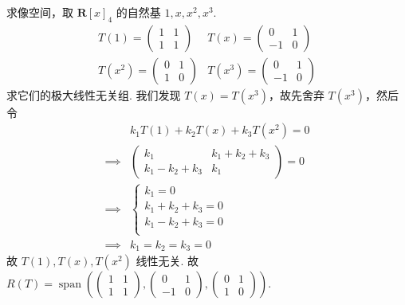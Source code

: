 \documentclass[12pt,fontset=fandol]{ctexart}
\begin{document}
\begin{solve}
\begin{enumerate}
                      求像空间，取 $ \mathbf{R}[x]_4 $ 的自然基 $ 1, x, x^2, x^3 $.
                      \[ \begin{matrix}
                              T(1) = \begin{pmatrix} 1 & 1 \\ 1 & 1 \end{pmatrix}   & T(x) = \begin{pmatrix} 0 & 1 \\ -1 & 0 \end{pmatrix}   \\
                              T(x^2) = \begin{pmatrix} 0 & 1 \\ 1 & 0 \end{pmatrix} & T(x^3) = \begin{pmatrix} 0 & 1 \\ -1 & 0 \end{pmatrix}
                          \end{matrix} \]
                      求它们的极大线性无关组. 我们发现 $ T(x) = T(x^3) $，故先舍弃 $ T(x^3) $，然后令
                      \begin{align*}
                                     & k_1 T(1) + k_2 T(x) + k_3 T(x^2) = 0                                             \\
                          \implies{} & \begin{pmatrix} k_1 & k_1 + k_2 + k_3 \\ k_1 - k_2 + k_3 & k_1 \end{pmatrix} = 0 \\
                          \implies{} & \begin{cases}
                                           k_1 = 0             \\
                                           k_1 + k_2 + k_3 = 0 \\
                                           k_1 - k_2 + k_3 = 0 \\
                                       \end{cases}                                                              \\
                          \implies{} & k_1 = k_2 = k_3 = 0
                      \end{align*}
                      故 $ T(1), T(x), T(x^2) $ 线性无关. 故 $ R(T) = \operatorname{span}\left(\begin{pmatrix} 1 & 1 \\ 1 & 1 \end{pmatrix}, \begin{pmatrix} 0 & 1 \\ -1 & 0 \end{pmatrix}, \begin{pmatrix} 0 & 1 \\ 1 & 0 \end{pmatrix}\right) $.


\end{enumerate}
\end{solve}
\end{document}
